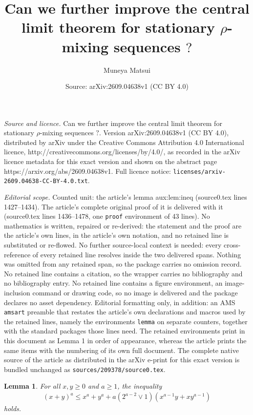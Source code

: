 \documentclass[10pt,a4paper]{amsart}
\title{Can we further improve the central limit theorem for stationary $\rho$-mixing sequences $?$}
\author{Muneya Matsui}
\date{Source: arXiv:2609.04638v1 (CC BY 4.0)}
\newtheorem{lemma}{Lemma}
\begin{document}
\maketitle

\noindent\emph{Source and licence.} Can we further improve the central limit theorem for stationary $\rho$-mixing sequences $?$. Version arXiv:2609.04638v1 (CC BY 4.0), distributed by arXiv under the Creative Commons Attribution 4.0 International licence, http://creativecommons.org/licenses/by/4.0/, as recorded in the arXiv licence metadata for this exact version and shown on the abstract page https://arxiv.org/abs/2609.04638v1. Full licence notice: \texttt{licenses/arxiv-2609.04638-CC-BY-4.0.txt}.\par\smallskip

\noindent\textit{Editorial scope.} Counted unit: the article's lemma aux:lem:ineq (source0.tex lines 1427--1434). The article's complete original proof of it is delivered with it (source0.tex lines 1436--1478, one \texttt{proof} environment of 43 lines). No mathematics is written, repaired or re-derived: the statement and the proof are the article's own lines, in the article's own notation, and no retained line is substituted or re-flowed.  No further source-local context is needed: every cross-reference of every retained line resolves inside the two delivered spans.  Nothing was omitted from any retained span, so the package carries no omission record.  No retained line contains a citation, so the wrapper carries no bibliography and no bibliography entry.  No retained line contains a figure environment, an image-inclusion command or drawing code, so no image is delivered and the package declares no asset dependency.  Editorial formatting only, in addition: an AMS \texttt{amsart} preamble that restates the article's own declarations and macros used by the retained lines, namely the environments \texttt{lemma} on separate counters, together with the standard packages those lines need.  The retained environments print in this document as Lemma 1 in order of appearance, whereas the article prints the same items with the numbering of its own full document.  The complete native source of the article as distributed in the arXiv e-print for this exact version is bundled unchanged as \texttt{sources/209378/source0.tex}.
\begin{lemma}
\label{aux:lem:ineq}
For all $x,y\ge 0$ and $a\ge 1$, the inequality
\begin{align*}
(x+y)^a \le x^a +y^a +a (2^{a-2}\vee 1) (x^{a-1}y +xy^{a-1})
\end{align*}
holds. 
\end{lemma}
\end{document}
